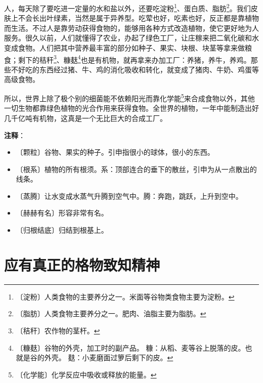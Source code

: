 \documentclass[12pt,UTF-8,openany]{ctexbook}
\begin{document}
\begin{normalsize}
    人，每天除了要吃进一定量的水和盐以外，还要吃淀粉\footnote{〔淀粉〕人类食物的主要养分之一。米面等谷物类食物主要为淀粉。}、蛋白质、脂肪\footnote{〔脂肪〕人类食物主要养分之一。肥肉、油脂主要为脂肪。}。我们皮肤上不会长出叶绿素，当然是属于异养型。吃荤也好，吃素也好，反正都是靠植物而生活。不过人是靠劳动获得食物的，能够用各种方式改造植物，使它更好地为人服务。很久以前，人们就懂得了农业，办起了绿色工厂，让庄稼来把二氧化碳和水变成食物。人们把其中营养最丰富的部分如种子、果实、块根、块茎等拿来做粮食；剩下的秸秆\footnote{〔秸秆〕农作物的茎杆。}、糠麸\footnote{〔糠麸〕谷物的外壳，加工时的副产品。 糠：从稻、麦等谷上脱落的皮。也就是谷的外壳。 麸：小麦磨面过箩后剩下的皮。}也是有机物，就再拿来办加工厂：养猪，养牛，养鸡。那些不好吃的东西经过猪、牛、鸡的消化吸收和转化，就变成了猪肉、牛奶、鸡蛋等高级食物。
    
    所以，世界上除了极个别的细菌能不依赖阳光而靠化学能\footnote{〔化学能〕化学反应中吸收或释放的能量。}来合成食物以外，其他一切生物都靠绿色植物的光合作用来获得食物。全世界的植物，一年中能制造出好几千亿吨有机物，这真是一个无比巨大的合成工厂。
    
\end{normalsize}


\newpage

\textbf{注释}：

\vspace{-1em}

\begin{itemize}
    \setlength\itemsep{-0.2em}
    \item 〔颗粒〕谷物、果实的种子。引申指很小的球体，很小的东西。
    \item 〔根系〕植物的所有根须。系：顶部连合的垂下的散丝，引申为从一点散出的线条。
    \item 〔蒸腾〕让水变成水蒸气升腾到空气中。腾：奔跑，跳跃，上升到空中。
    \item 〔赫赫有名〕形容非常有名。
    \item 〔归根结底〕归结到根基上。
\end{itemize}

\chapter{应有真正的格物致知精神}
\end{document}

